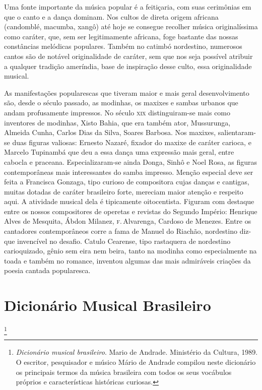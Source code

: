 Uma fonte importante da música popular é a feitiçaria, com suas
cerimônias em que o canto e a dança dominam. Nos cultos de direta origem
africana (candomblé, macumba, xangô) até hoje se consegue recolher
música originalíssima como caráter, que, sem ser legitimamente africana,
foge bastante das nossas constâncias melódicas populares. Também no
catimbó nordestino, numerosos cantos são de notável originalidade de
caráter, sem que nos seja possível atribuir a qualquer tradição
ameríndia, base de inspiração desse culto, essa originalidade musical.

As manifestações popularescas que tiveram maior e mais geral
desenvolvimento são, desde o século passado, as modinhas, os maxixes e
sambas urbanos que andam profusamente impressos. No século \textsc{xix}
distinguiram-se mais como inventores de modinhas, Xisto Bahia, que era
também ator, Mussurunga, Almeida Cunha, Carlos Dias da Silva, Soares
Barbosa. Nos maxixes, salientaram-se duas figuras valiosas: Ernesto
Nazaré, fixador do maxixe de caráter carioca, e Marcelo Tupinambá que
deu a essa dança uma expressão mais geral, entre cabocla e praceana.
Especializaram-se ainda Donga, Sinhô e Noel Rosa, as figuras
contemporâneas mais interessantes do samba impresso. Menção especial
deve ser feita a Francisca Gonzaga, tipo curioso de compositora cujas
danças e cantigas, muitas dotadas de caráter brasileiro forte, mereciam
maior atenção e respeito aqui. A atividade musical dela é tipicamente
oitocentista. Figuram com destaque entre os nossos compositores de
operetas e revistas do Segundo Império: Henrique Alves de Mesquita,
Ábdon Milanez, \textsc{f}.\,Alvarenga, Cardoso de Menezes. Entre os cantadores
contemporâneos corre a fama de Manuel do Riachão, nordestino diz-que
invencível no desafio. Catulo Cearense, tipo rastaquera de nordestino
carioquizado, gênio sem eira nem beira, tanto na modinha como
especialmente na toada e também no romance, inventou algumas das mais
admiráveis criações da poesia cantada popularesca.



\chapter{Dicionário Musical Brasileiro}\footnote{\textit{Dicionário musical brasileiro}. Mario de Andrade. Ministério da Cultura, 1989. O escritor, pesquisador e músico Mário de Andrade compilou neste dicionário os principais termos da música brasileira com todos os seus vocábulos próprios e características históricas curiosas.}

